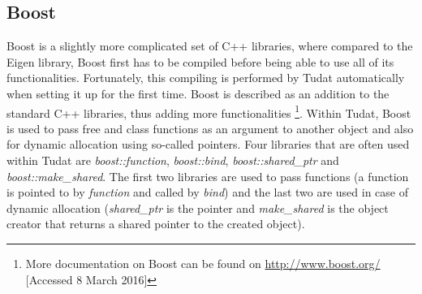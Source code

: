 \subsection{Boost}
\label{subsec:boost}
Boost is a slightly more complicated set of C++ libraries, where compared to the Eigen library, Boost first has to be compiled before being able to use all of its functionalities. Fortunately, this compiling is performed by \ac{Tudat} automatically when setting it up for the first time. Boost is described as an addition to the standard C++ libraries, thus adding more functionalities \citep{dirkx2016tudat} \footnote{More documentation on Boost can be found on \url{http://www.boost.org/} [Accessed 8 March 2016]}. Within \ac{Tudat}, Boost is used to pass free and class functions as an argument to another object and also for dynamic allocation using so-called pointers. Four libraries that are often used within \ac{Tudat} are \textit{boost::function}, \textit{boost::bind}, \textit{boost::shared\_ptr} and \textit{boost::make\_shared}. The first two libraries are used to pass functions (a function is pointed to by \textit{function} and called by \textit{bind}) and the last two are used in case of dynamic allocation (\textit{shared\_ptr} is the pointer and \textit{make\_shared} is the object creator that returns a shared pointer to the created object). 

